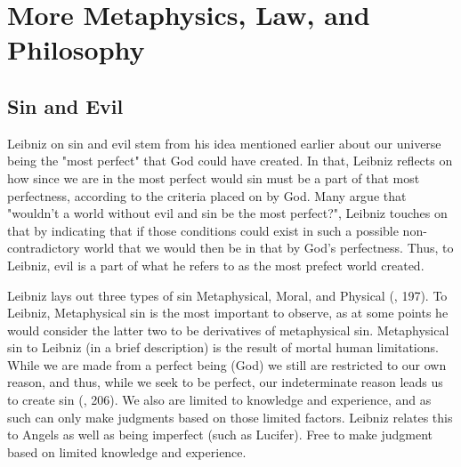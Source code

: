 \documentclass[12pt]{report}
\begin{document}
\chapter{More Metaphysics, Law, and Philosophy}
    
\section*{Sin and Evil}
Leibniz on sin and evil stem from his idea mentioned earlier about our universe being the "most perfect" that God could have created.
In that, Leibniz reflects on how since we are in the most perfect would sin must be a part of that most perfectness, according to the criteria placed on by God.
Many argue that "wouldn't a world without evil and sin be the most perfect?", Leibniz touches on that by indicating that if those conditions could exist in such a possible non-contradictory world that we would then be in that by God's perfectness.
Thus, to Leibniz, evil is a part of what he refers to as the most prefect world created.\\ \par
Leibniz lays out three types of sin Metaphysical, Moral, and Physical (, 197).
To Leibniz, Metaphysical sin is the most important to observe, as at some points he would consider the latter two to be derivatives of metaphysical sin.
Metaphysical sin to Leibniz (in a brief description) is the result of mortal human limitations.
While we are made from a perfect being (God) we still are restricted to our own reason, and thus, while we seek to be perfect, our indeterminate reason leads us to create sin (, 206).
We also are limited to knowledge and experience, and as such can only make judgments based on those limited factors. 
Leibniz relates this to Angels as well as being imperfect (such as Lucifer). 
Free to make judgment based on limited knowledge and experience.
\end{document}
